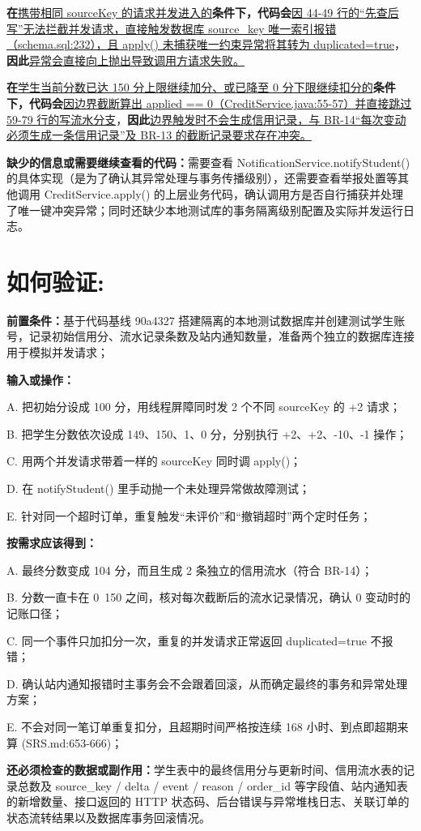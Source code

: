 \documentclass[a4paper,11pt,UTF8]{ctexart}
\begin{document}
{\bfseries 在}\uline{携带相同 sourceKey 的请求并发进入的}{\bfseries 条件下，代码会}\uline{因 44-49 行的“先查后写”无法拦截并发请求，直接触发数据库 source\_key 唯一索引报错（schema.sql:232），且 apply() 未捕获唯一约束异常将其转为 duplicated=true}{，\bfseries 因此}\uline{异常会直接向上抛出导致调用方请求失败。}

{\bfseries 在}\uline{学生当前分数已达 150 分上限继续加分、或已降至 0 分下限继续扣分的}{\bfseries 条件下，代码会}\uline{因边界截断算出 applied == 0（CreditService.java:55-57）并直接跳过 59-79 行的写流水分支}{，\bfseries 因此}\uline{边界触发时不会生成信用记录，与 BR-14“每次变动必须生成一条信用记录”及 BR-13 的截断记录要求存在冲突。}

{\bfseries 缺少的信息或需要继续查看的代码：}需要查看 NotificationService.notifyStudent() 的具体实现（是为了确认其异常处理与事务传播级别），还需要查看举报处置等其他调用 CreditService.apply() 的上层业务代码，确认调用方是否自行捕获并处理了唯一键冲突异常；同时还缺少本地测试库的事务隔离级别配置及实际并发运行日志。

\section{如何验证:}
{\bfseries 前置条件：}基于代码基线 90a4327 搭建隔离的本地测试数据库并创建测试学生账号，记录初始信用分、流水记录条数及站内通知数量，准备两个独立的数据库连接用于模拟并发请求；

{\bfseries 输入或操作：}

A. 把初始分设成 100 分，用线程屏障同时发 2 个不同 sourceKey 的 +2 请求；

B. 把学生分数依次设成 149、150、1、0 分，分别执行 +2、+2、-10、-1 操作；

C. 用两个并发请求带着一样的 sourceKey 同时调 apply()；

D. 在 notifyStudent() 里手动抛一个未处理异常做故障测试；

E. 针对同一个超时订单，重复触发“未评价”和“撤销超时”两个定时任务；

{\bfseries 按需求应该得到：}

A. 最终分数变成 104 分，而且生成 2 条独立的信用流水（符合 BR-14）；

B. 分数一直卡在 0~150 之间，核对每次截断后的流水记录情况，确认 0 变动时的记账口径；

C. 同一个事件只加扣分一次，重复的并发请求正常返回 duplicated=true 不报错；

D. 确认站内通知报错时主事务会不会跟着回滚，从而确定最终的事务和异常处理方案；

E. 不会对同一笔订单重复扣分，且超期时间严格按连续 168 小时、到点即超期来算 (SRS.md:653-666)；

{\bfseries 还必须检查的数据或副作用：}学生表中的最终信用分与更新时间、信用流水表的记录总数及 source\_key / delta / event / reason / order\_id 等字段值、站内通知表的新增数量、接口返回的 HTTP 状态码、后台错误与异常堆栈日志、关联订单的状态流转结果以及数据库事务回滚情况。


\clearpage
\end{document}
